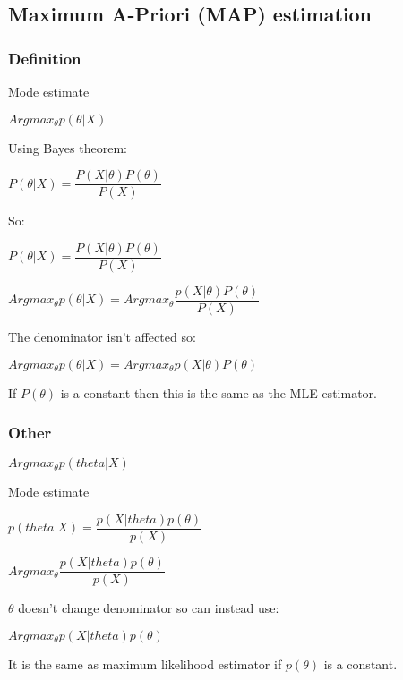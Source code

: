 
\subsection{Maximum A-Priori (MAP) estimation}

\subsubsection{Definition}

Mode estimate

\(Arg max_\theta p(\theta | X)\)

Using Bayes theorem:

\(P(\theta | X)= \dfrac{P(X|\theta )P(\theta)}{P(X)}\)

So:

\(P(\theta | X)= \dfrac{P(X|\theta )P(\theta)}{P(X)}\)

\(Argmax_\theta p(\theta | X)=Argmax_\theta \dfrac{p(X|\theta )P(\theta)}{P(X)}\)

The denominator isn't affected so:

\(Arg max_\theta p(\theta | X)=Arg max_\theta p(X|\theta )P(\theta)\)

If \(P(\theta )\) is a constant then this is the same as the MLE estimator.

\subsubsection{Other}

\(Argmax_\theta p(theta|X)\)

Mode estimate

\(p(theta|X)= \dfrac{p(X| theta)p(\theta )}{p(X)}\)

\(Argmax_\theta \dfrac{p(X| theta)p(\theta )}{p(X)}\)

\(\theta \) doesn't change denominator so can instead use:

\(Argmax_\theta p(X| theta)p(\theta )\)

It is the same as maximum likelihood estimator if \(p(\theta )\) is a constant. 

